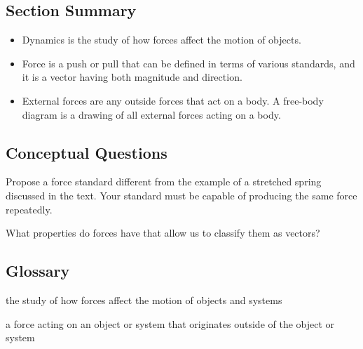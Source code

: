 \documentclass[
]{book}
\providecommand{\tightlist}{%
  \setlength{\itemsep}{0pt}\setlength{\parskip}{0pt}}
\newenvironment{conceptual-questions}{}{}
\begin{document}
\hypertarget{fs-id1772190-summary}{}
\hypertarget{section-summary-8}{%
\subsection{Section Summary}\label{section-summary-8}}

\begin{itemize}
\tightlist
\item
  {Dynamics} is the study of how forces affect the
  motion of objects.
\item
  {Force} is a push or pull that can be defined in
  terms of various standards, and it is a vector having both magnitude
  and direction.
\item
  {External forces} are any outside forces that act
  on a body. A {free-body diagram} is a drawing of
  all external forces acting on a body.
\end{itemize}

\hypertarget{fs-id1477045}{}
\begin{conceptual-questions}

\hypertarget{conceptual-questions-11}{%
\subsection{Conceptual Questions}\label{conceptual-questions-11}}

\hypertarget{fs-id1445672}{}
\leavevmode\hypertarget{fs-id1376471}{}%
Propose a force standard different from the example of a stretched
spring discussed in the text. Your standard must be capable of producing
the same force repeatedly.

\hypertarget{fs-id1654920}{}
\leavevmode\hypertarget{fs-id1558972}{}%
What properties do forces have that allow us to classify them as
vectors?

\end{conceptual-questions}

\hypertarget{glossary-11}{%
\subsection{Glossary}\label{glossary-11}}

\begin{description}
\tightlist
\item[dynamics]
the study of how forces affect the motion of objects and systems
\end{description}

\begin{description}
\tightlist
\item[external force]
a force acting on an object or system that originates outside of the
object or system
\end{description}
\end{document}
